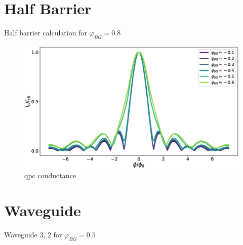 \section{Half Barrier}
Half barrier calculation for $\varphi_{BG} = 0.8$
\begin{figure}
\includegraphics[width=\textwidth]{figure/numericalmodel/hb_lower}
\caption{qpc conductance}
\end{figure}

\section{Waveguide}
Waveguide 3, 2 for $\varphi_{BG} = 0.5$
